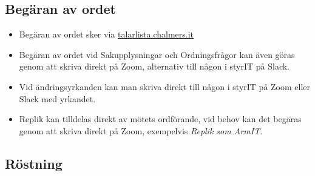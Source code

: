 \documentclass[11pt, noincludeaddress, nopagination]{classes/cthit}
\begin{document}
\subsection*{Begäran av ordet}
\begin{itemize}
    \item Begäran av ordet sker via \href{https://talarlista.chalmers.it/user}{talarlista.chalmers.it}
    \item Begäran av ordet vid Sakupplysningar och Ordningsfrågor kan även göras genom att skriva direkt på Zoom, alternativ till någon i styrIT på Slack.
    \item Vid ändringsyrkanden kan man skriva direkt till någon i styrIT på Zoom eller Slack med yrkandet.
    \item Replik kan tilldelas direkt av mötets ordförande, vid behov kan det begäras genom att skriva direkt på Zoom, exempelvis \textit{Replik som ArmIT}.
\end{itemize}

\subsection*{Röstning}
\end{document}
